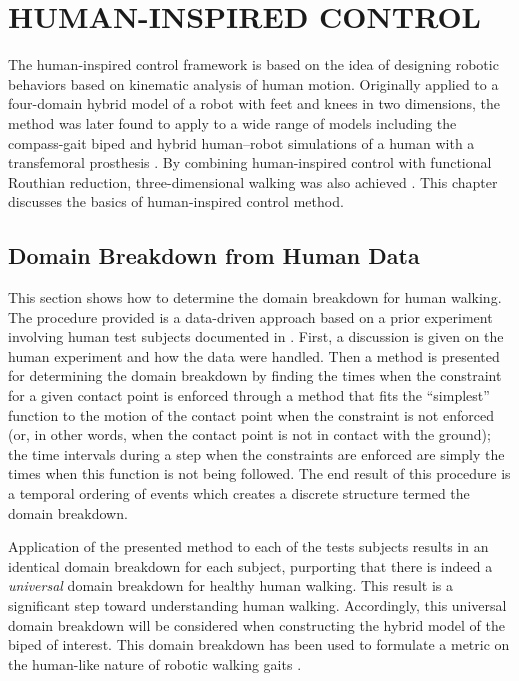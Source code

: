 \chapter{\uppercase{Human-Inspired Control}} \label{ch:hic}

The human-inspired control framework is based on the idea of designing robotic
behaviors based on kinematic analysis of human motion.
%
Originally applied to a four-domain hybrid model of a robot with feet and knees
\cite{Sinnet2011b} in two dimensions, the method was later found to apply to a
wide range of models including the compass-gait biped \cite{Sinnet2011a} and
hybrid human--robot simulations of a human with a transfemoral prosthesis
\cite{Sinnet2011}.
%
By combining human-inspired control with functional Routhian reduction,
three-dimensional walking was also achieved \cite{Sinnet2012a, Sinnet2012}.
%
This chapter discusses the basics of human-inspired control method.

\section{Domain Breakdown from Human Data} \label{sec:domainbreakdown}

This section shows how to determine the domain breakdown for human walking.
%
The procedure provided is a data-driven approach based on a prior experiment
involving human test subjects documented in \cite{Ames2011a}.
%
First, a discussion is given on the human experiment and how the data were
handled. 
%
Then a method is presented for determining the domain breakdown by finding the
times when the constraint for a given contact point is enforced through a method
that fits the ``simplest'' function to the motion of the contact point when the
constraint is not enforced (or, in other words, when the contact point is not in
contact with the ground);
%
the time intervals during a step when the constraints are enforced are simply
the times when this function is not being followed.
%
The end result of this procedure is a temporal ordering of events which creates
a discrete structure termed the domain breakdown.

Application of the presented method to each of the tests subjects results in an
identical domain breakdown for each subject, purporting that there is indeed a
{\em universal} domain breakdown for healthy human walking.
%
This result is a significant step toward understanding human walking.
%
Accordingly, this universal domain breakdown will be considered when
constructing the hybrid model of the biped of interest.
%
This domain breakdown has been used to formulate a metric on the human-like
nature of robotic walking gaits \cite{Ames2011, Vasudevan2013}.

